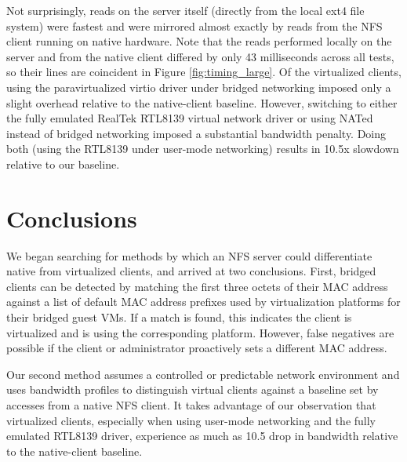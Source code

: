 \documentclass[11pt,pdftex,twocolumn]{article}
\begin{document}
Not surprisingly, reads on the server itself (directly from the local ext4 file system) were fastest and were mirrored almost exactly by reads from the NFS client running on native hardware. Note that the reads performed locally on the server and from the native client differed by only 43 milliseconds across all tests, so their lines are coincident in Figure \ref{fig:timing_large}. Of the virtualized clients, using the paravirtualized virtio driver under bridged networking imposed only a slight overhead relative to the native-client baseline. However, switching to either the fully emulated RealTek RTL8139 virtual network driver or using NATed instead of bridged networking imposed a substantial bandwidth penalty. Doing both (using the RTL8139 under user-mode networking) results in 10.5x slowdown relative to our baseline. 



\section{Conclusions}
We began searching for methods by which an NFS server could differentiate native from virtualized clients, and arrived at two conclusions. First, bridged clients can be detected by matching the first three octets of their MAC address against a list of default MAC address prefixes used by virtualization platforms for their bridged guest VMs. If a match is found, this indicates the client is virtualized and is using the corresponding platform. However, false negatives are possible if the client or administrator proactively sets a different MAC address. 

Our second method assumes a controlled or predictable network environment and uses bandwidth profiles to distinguish virtual clients against a baseline set by accesses from a native NFS client. It takes advantage of our observation that virtualized clients, especially when using user-mode networking and the fully emulated RTL8139 driver, experience as much as 10.5 drop in bandwidth relative to the native-client baseline. 
\end{document}
